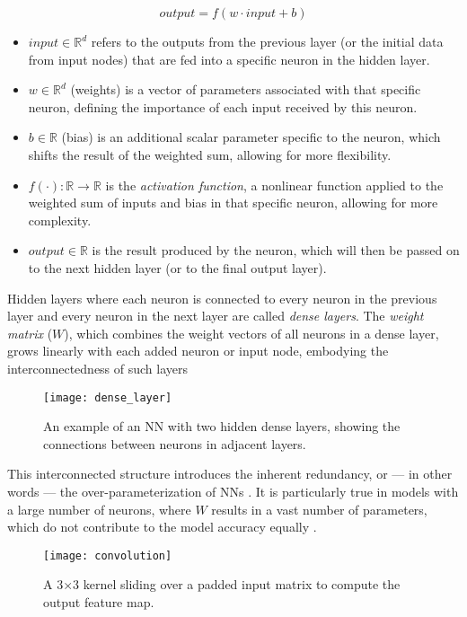 \[
\textit{output} = f(w \cdot \textit{input} + b)
\]

\begin{itemize}
  \item \( input \in \mathbb{R}^d \) refers to the outputs from the previous layer (or the initial data from input nodes) that are fed into a specific neuron in the hidden layer.
  \item \( w \in \mathbb{R}^d \) (weights) is a vector of parameters associated with that specific neuron, defining the importance of each input received by this neuron. 
  \item \( b \in \mathbb{R} \) (bias) is an additional scalar parameter specific to the neuron, which shifts the result of the weighted sum, allowing for more flexibility.
  \item \( f(\cdot): \mathbb{R} \to \mathbb{R} \) is the \textit{activation function}, a nonlinear function applied to the weighted sum of inputs and bias in that specific neuron, allowing for more complexity.
  \item \( output \in \mathbb{R} \) is the result produced by the neuron, which will then be passed on to the next hidden layer (or to the final output layer).
\end{itemize}

Hidden layers where each neuron is connected to every neuron in the previous layer 
and every neuron in the next layer are called \textit{dense layers}.
The \textit{weight matrix} (\( W\)), which combines the weight vectors of all neurons in a dense layer,
grows linearly with each added neuron or input node, 
embodying the interconnectedness of such layers
 
\begin{figure}[t!]
  \centering
  \texttt{[image: dense\_layer]}
  \caption{An example of an NN with two hidden dense layers, showing the connections between neurons in adjacent layers.}
  \label{fig:dense_layer}
\end{figure}

This interconnected structure introduces the inherent redundancy, or — in other words — the over-parameterization of NNs \cite{gholami2021survey}.
It is particularly true in models with a large number of neurons, 
where \( W \) results in a vast number of parameters, which do not contribute to the model accuracy equally \cite{hubara2016qnn}.

\begin{figure}[b!]
  \centering
  \texttt{[image: convolution]}
  \caption{A 3×3 kernel sliding over a padded input matrix to compute the output feature map.}
  \label{fig:convolution}
\end{figure}

